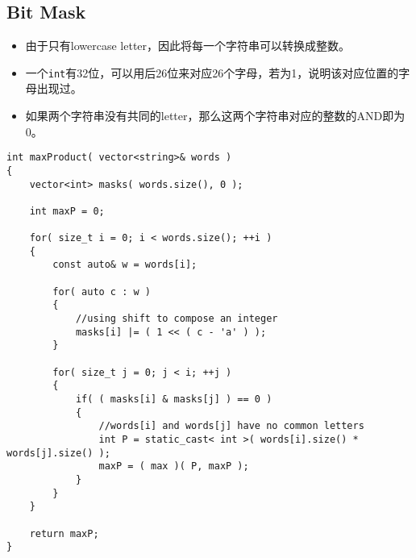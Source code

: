\subsection{Bit Mask}
\begin{itemize}
\item 由于只有lowercase letter，因此将每一个字符串可以转换成整数。
\item 一个\texttt{int}有32位，可以用后26位来对应26个字母，若为1，说明该对应位置的字母出现过。
\item 如果两个字符串没有共同的letter，那么这两个字符串对应的整数的AND即为0。
\end{itemize}
\setcounter{lstlisting}{0}
\begin{lstlisting}[style=customc, caption={Bit Mask}]
int maxProduct( vector<string>& words )
{
    vector<int> masks( words.size(), 0 );

    int maxP = 0;

    for( size_t i = 0; i < words.size(); ++i )
    {
        const auto& w = words[i];

        for( auto c : w )
        {
            //using shift to compose an integer
            masks[i] |= ( 1 << ( c - 'a' ) );
        }

        for( size_t j = 0; j < i; ++j )
        {
            if( ( masks[i] & masks[j] ) == 0 )
            {
                //words[i] and words[j] have no common letters
                int P = static_cast< int >( words[i].size() * words[j].size() );
                maxP = ( max )( P, maxP );
            }
        }
    }

    return maxP;
}

\end{lstlisting}
